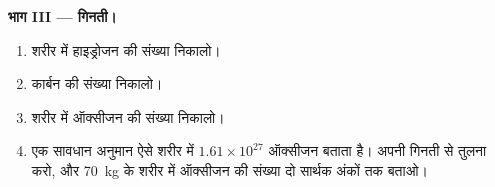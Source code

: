 \begin{problem}
\medskip
\noindent\textbf{भाग III --- गिनती।}
\begin{enumerate}[resume]
  \item शरीर में हाइड्रोजन  की संख्या निकालो।
  \item कार्बन  की संख्या निकालो।
  \item शरीर में ऑक्सीजन  की संख्या निकालो।
  \item एक सावधान अनुमान ऐसे शरीर में $1.61 \times 10^{27}$ ऑक्सीजन 
        बताता है। अपनी गिनती से तुलना करो, और \qty{70}{kg} के शरीर में ऑक्सीजन
         की संख्या दो सार्थक अंकों तक बताओ।
\end{enumerate}
\end{problem}

